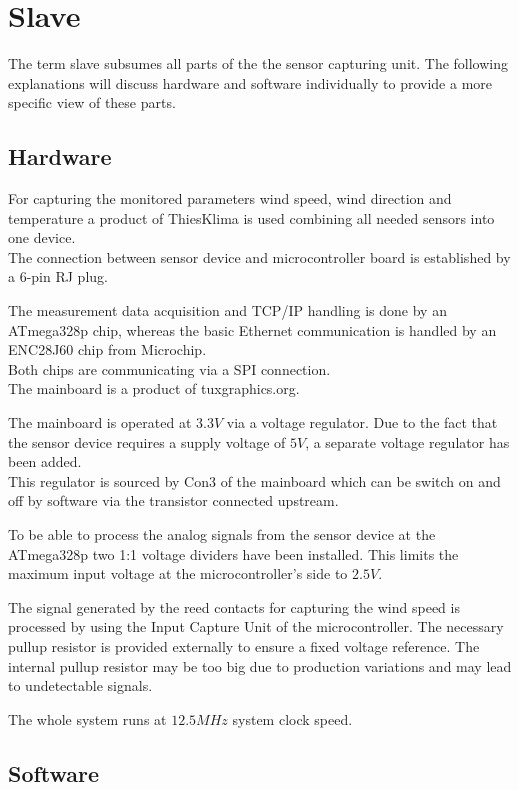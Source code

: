
\chapter{Slave}

The term slave subsumes all parts of the the sensor capturing unit.
The following explanations will discuss hardware and software individually to provide a more specific view of these parts.

\section{Hardware}
For capturing the monitored parameters wind speed, wind direction and temperature a product of ThiesKlima is used combining all needed sensors into one device.\\
The connection between sensor device and microcontroller board is established by a 6-pin RJ plug.

The measurement data acquisition and TCP/IP handling is done by an ATmega328p chip, whereas the basic Ethernet communication is handled by an ENC28J60 chip from Microchip.\\
Both chips are communicating via a SPI connection.\\
The mainboard is a product of tuxgraphics.org.

The mainboard is operated at $3.3 V$ via a voltage regulator. Due to the fact that the sensor device requires a supply voltage of $5 V$, a separate voltage regulator has been added.\\
This regulator is sourced by Con3 of the mainboard which can be switch on and off by software via the transistor connected upstream.

To be able to process the analog signals from the sensor device at the ATmega328p two 1:1 voltage dividers have been installed. This limits the maximum input voltage at the microcontroller's side to $2.5 V$.

The signal generated by the reed contacts for capturing the wind speed is processed by using the Input Capture Unit of the microcontroller. The necessary pullup resistor is provided externally to ensure a fixed voltage reference. The internal pullup resistor may be too big due to production variations and may lead to undetectable signals.

The whole system runs at $12.5 MHz$ system clock speed.

\section{Software}

